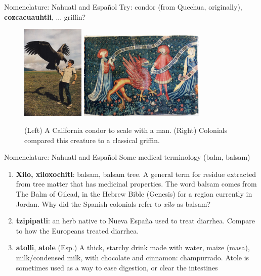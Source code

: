 \documentclass{beamer}
\begin{document}
\begin{frame}{Nomenclature: Nahuatl and Espa\~{n}ol}
Try: condor (from Quechua, originally), \textbf{cozcacuauhtli}, ... griffin?
\begin{figure}
\centering
\includegraphics[width=3cm]{figures/condor.jpg}
\includegraphics[width=6cm]{figures/griff.png}
\caption{(Left) A California condor to scale with a man.  (Right) Colonials compared this creature to a classical griffin.}
\end{figure}
\end{frame}

\begin{frame}{Nomenclature: Nahuatl and Espa\~{n}ol}
\small
Some medical terminology (balm, balsam)
\begin{enumerate}
\item \textbf{Xilo, xiloxochitl}: balsam, balsam tree.  A general term for residue extracted from tree matter that has medicinal properties.  The word balsam comes from The Balm of Gilead, in the Hebrew Bible (Genesis) for a region currently in Jordan.  Why did the Spanish colonials refer to \textit{xilo} as balsam?
\item \textbf{tzipipatli}: an herb native to Nueva Espa\~{n}a used to treat diarrhea.  Compare to how the Europeans treated diarrhea.
\item \textbf{atolli}, \textbf{atole} (Esp.) A thick, starchy drink made with water, maize (masa), milk/condensed milk, with chocolate and cinnamon: \alert{champurrado}.  Atole is sometimes used as a way to ease digestion, or clear the intestines
\end{enumerate}
\end{frame}
\end{document}
